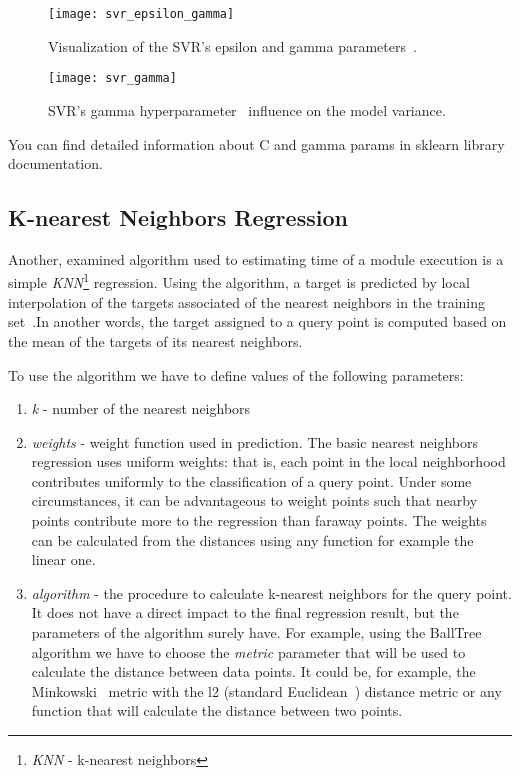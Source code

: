 \begin{figure}[!htb]
	\caption{Visualization of the SVR's epsilon and gamma parameters~.}
	\centering
	\label{fig:svr_epsilon_gamma}
	\texttt{[image: svr\_epsilon\_gamma]}
\end{figure}
\begin{figure}[!htb]
	\caption{SVR's gamma hyperparameter~ influence on the model variance.}
	\centering
	\label{fig:gamma}
	\texttt{[image: svr\_gamma]}
\end{figure}
You can find detailed information about C and gamma params in sklearn library documentation\cite{rbf_params}.

\subsection{K-nearest Neighbors Regression}

Another, examined algorithm used to estimating time of a module execution is a simple \textit{KNN}\footnote{\textit{KNN} - k-nearest neighbors} regression. Using the algorithm, a target is predicted by local interpolation of the targets associated of the nearest neighbors in the training set~\cite{knnreg}.In another words, the target assigned to a query point is computed based on the mean of the targets of its nearest neighbors.

To use the algorithm we have to define values of the following parameters:
\begin{enumerate}
	\item \textit{k} - number of the nearest neighbors
	\item \textit{weights} - weight function used in prediction. The basic nearest neighbors regression uses uniform weights: that is, each point in the local neighborhood contributes uniformly to the classification of a query point. Under some circumstances, it can be advantageous to weight points such that nearby points contribute more to the regression than faraway points. The weights can be calculated from the distances using any function for example the linear one.
	\item \textit{algorithm} - the procedure to calculate k-nearest neighbors for the query point. It does not have a direct impact to the final regression result, but the parameters of the algorithm surely have. For example, using the BallTree algorithm we have to choose the \textit{metric} parameter that will be used to calculate the distance between data points. It could be, for example, the Minkowski~\cite{minkowski} metric with the l2 (standard Euclidean~\cite{euclidean}) distance metric or any function that will calculate the distance between two points.
\end{enumerate}

